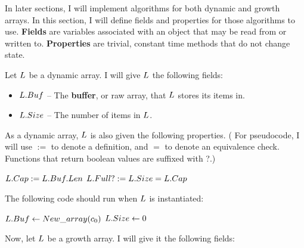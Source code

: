 In later sections, I will implement algorithms for both dynamic and growth arrays. In this section, I will define fields and properties for those algorithms to use. \textbf{Fields} are variables associated with an object that may be read from or written to. \textbf{Properties} are trivial, constant time methods that do not change state.

Let $\VarList$ be a dynamic array. I will give $\VarList$ the following fields:

\begin{itemize}
	\item $L.Buf$ -- The \textbf{buffer}, or raw array, that $\VarList$ stores its items in.
	\item $L.Size$ -- The number of items in $\VarList$.
\end{itemize}

As a dynamic array, $\VarList$ is also given the following properties. ({\HdrNote} For pseudocode, I will use $:=$ to denote a definition, and $=$ to denote an equivalence check. Functions that return boolean values are suffixed with ?.)

\begin{algorithm}
	\begin{algorithmic}
		\State $L.Cap := L.Buf.Len$
		\State
		\State $L.Full? := L.Size = L.Cap$
	\end{algorithmic}
\end{algorithm}

The following code should run when $\VarList$ is instantiated:

\begin{algorithm}
	\begin{algorithmic}
		\Procedure{$\FuncConstructor$}{$\VarList$}
			\State $L.Buf \gets New\_array(c_0)$
			\State $L.Size \gets 0$
		\EndProcedure
	\end{algorithmic}
\end{algorithm}

Now, let $\VarList$ be a growth array. I will give it the following fields:

